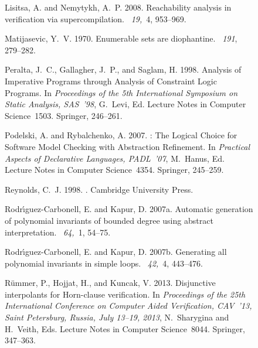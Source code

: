 \documentclass[english]{tlp}
\begin{document}
\begin{figure}[ht]
\begin{flushleft}
\begin{minipage}{124mm}
\begin{thebibliography}{}
{\sc Lisitsa, A.} {\sc and} {\sc Nemytykh, A.~P.} 2008.
\newblock Reachability analysis in verification via supercompilation.
~{\em 19,\/}~4, 953--969.

{\sc Matijasevic, Y.~V.} 1970.
\newblock Enumerable sets are diophantine.
~{\em 191}, 279--282.

{\sc Peralta, J.~C.}, {\sc Gallagher, J.~P.}, {\sc and} {\sc Saglam, H.} 1998.
\newblock Analysis of {I}mperative {P}rograms through {A}nalysis of
  {C}onstraint {L}ogic {P}rograms.
\newblock In {\em Proceedings of the 5th {I}nternational {S}ymposium on
  {S}tatic {A}nalysis, {SAS}~'98}, {G.~{L}evi}, Ed. Lecture Notes in Computer
  Science~1503. Springer, 246--261.

{\sc Podelski, A.} {\sc and} {\sc Rybalchenko, A.} 2007.
: {T}he {L}ogical {C}hoice for {S}oftware {M}odel {C}hecking
  with {A}bstraction {R}efinement.
\newblock In {\em Practical Aspects of Declarative Languages, {PADL}~'07},
  {M.~Hanus}, Ed. Lecture Notes in Computer Science~4354. Springer, 245--259.

{\sc Reynolds, C.~J.} 1998.
.
\newblock Cambridge University Press.

{\sc Rodr{\'{\i}}guez{-}Carbonell, E.} {\sc and} {\sc Kapur, D.} 2007a.
\newblock Automatic generation of polynomial invariants of bounded degree using
  abstract interpretation.
~{\em 64,\/}~1, 54--75.

{\sc Rodr{\'{\i}}guez{-}Carbonell, E.} {\sc and} {\sc Kapur, D.} 2007b.
\newblock Generating all polynomial invariants in simple loops.
~{\em 42,\/}~4, 443--476.

{\sc R{\"u}mmer, P.}, {\sc Hojjat, H.}, {\sc and} {\sc Kuncak, V.} 2013.
\newblock Disjunctive interpolants for {H}orn-clause verification.
\newblock In {\em Proceedings of the 25th International Conference on Computer
  Aided Verification, {CAV}~'13, Saint Petersburg, Russia, July 13--19, 2013},
  {N.~Sharygina} {and} {H.~Veith}, Eds. Lecture Notes in Computer Science~8044.
  Springer, 347--363.


\end{thebibliography}
\end{minipage}
\end{flushleft}
\end{figure}
\end{document}
